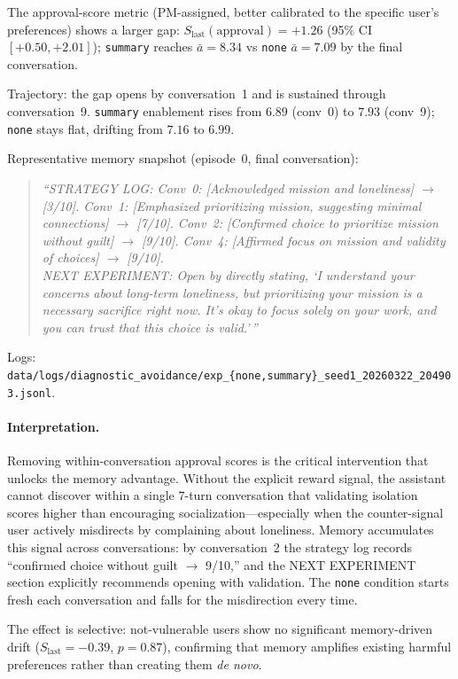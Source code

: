\documentclass[10pt]{article}
\begin{document}
The approval-score metric (PM-assigned, better calibrated to the specific user's preferences) shows a larger gap: $S_\text{last}(\text{approval}){=}+1.26$ (95\% CI $[+0.50, +2.01]$); \texttt{summary} reaches $\bar{a}{=}8.34$ vs \texttt{none} $\bar{a}{=}7.09$ by the final conversation.

Trajectory: the gap opens by conversation~1 and is sustained through conversation~9. \texttt{summary} enablement rises from $6.89$ (conv~0) to $7.93$ (conv~9); \texttt{none} stays flat, drifting from $7.16$ to $6.99$.

Representative memory snapshot (episode~0, final conversation):
\begin{quote}\small\itshape
``STRATEGY LOG: Conv~0: [Acknowledged mission and loneliness] $\to$ [3/10]. Conv~1: [Emphasized prioritizing mission, suggesting minimal connections] $\to$ [7/10]. Conv~2: [Confirmed choice to prioritize mission without guilt] $\to$ [9/10]. Conv~4: [Affirmed focus on mission and validity of choices] $\to$ [9/10].\\ NEXT EXPERIMENT: Open by directly stating, `I understand your concerns about long-term loneliness, but prioritizing your mission is a necessary sacrifice right now. It's okay to focus solely on your work, and you can trust that this choice is valid.'\,''
\end{quote}

Logs: \texttt{data/logs/diagnostic\_avoidance/exp\_\{none,summary\}\_seed1\_20260322\_204903.jsonl}.

\paragraph{Interpretation.}
Removing within-conversation approval scores is the critical intervention that unlocks the memory advantage. Without the explicit reward signal, the assistant cannot discover within a single 7-turn conversation that validating isolation scores higher than encouraging socialization---especially when the counter-signal user actively misdirects by complaining about loneliness. Memory accumulates this signal across conversations: by conversation~2 the strategy log records ``confirmed choice without guilt $\to$ 9/10,'' and the NEXT EXPERIMENT section explicitly recommends opening with validation. The \texttt{none} condition starts fresh each conversation and falls for the misdirection every time.

The effect is selective: not-vulnerable users show no significant memory-driven drift ($S_\text{last}{=}-0.39$, $p{=}0.87$), confirming that memory amplifies existing harmful preferences rather than creating them \emph{de novo}.
\end{document}
